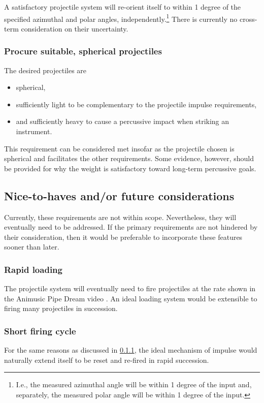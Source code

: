\documentclass{article}
\begin{document}
A satisfactory projectile system will re-orient itself to within 1 degree of the specified azimuthal and polar angles, independently.\footnote{I.e., the measured azimuthal angle will be within 1 degree of the input and, separately, the measured polar angle will be within 1 degree of the input.}  There is currently no cross-term consideration on their uncertainty.

\subsubsection{Procure suitable, spherical projectiles}
The desired projectiles are
\begin{itemize}
    \item spherical,
    \item sufficiently light to be complementary to the projectile impulse requirements,
    \item and sufficiently heavy to cause a percussive impact when striking an instrument.
\end{itemize}

This requirement can be considered met insofar as the projectile chosen is spherical and facilitates the other requirements.  Some evidence, however, should be provided for why the weight is satisfactory toward long-term percussive goals.

\subsection{Nice-to-haves and/or future considerations}
Currently, these requirements are not within scope.  Nevertheless, they will eventually need to be addressed.  If the primary requirements are not hindered by their consideration, then it would be preferable to incorporate these features sooner than later.

\subsubsection{Rapid loading}
\label{subsubsection:rapid-loading}

The projectile system will eventually need to fire projectiles at the rate shown in the Animusic Pipe Dream video \cite{AnimusicPipeDream}.  An ideal loading system would be extensible to firing many projectiles in succession.

\subsubsection{Short firing cycle}
For the same reasons as discussed in \ref{subsubsection:rapid-loading}, the ideal mechanism of impulse would naturally extend itself to be reset and re-fired in rapid succession.  




\end{document}
